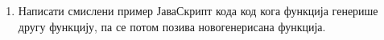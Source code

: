 \documentclass[a4paper]{article}
\begin{document}
\begin{enumerate}
\hrulefill

\hrulefill

\hrulefill

\hrulefill

\hrulefill

\hrulefill

\item Написати смислени пример ЈаваСкрипт кода код кога функција генерише другу функцију, па се потом позива новогенерисана функција. 

\hrulefill

\hrulefill

\hrulefill

\hrulefill

\hrulefill

\hrulefill

\hrulefill

\hrulefill

\hrulefill

\hrulefill


\end{enumerate}
\end{document}

